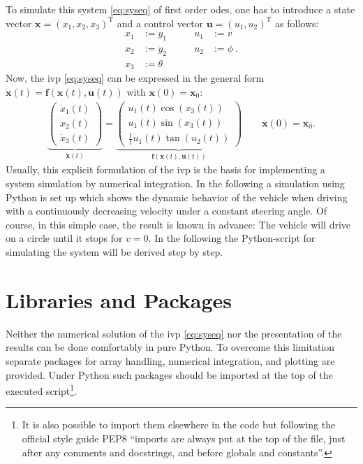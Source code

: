 \documentclass[a4paper,12pt,headinclude=true,headsepline,parskip=half,DIV=12]{scrartcl}
\newcommand{\uu}{\mathbf{u}}
\newcommand{\f}{\mathbf{f}}
\newcommand{\x}{\mathbf{x}}
\newcommand{\xZero}{\mathbf{x}_0}
\begin{document}
To simulate this system \eqref{eq:syseq} of first order \glspl{ode}, one has to introduce a state vector $\x=(x_1,x_2,x_3)^\mathrm{T}$ and a control vector $\uu=(u_1,u_2)^\mathrm{T}$ as follows:
\begin{subequations}
\begin{alignat}{2}
x_1 &:= y_1 &\qquad u_1 &:= v\\
x_2 &:= y_2 &\qquad  u_2 &:= \phi \:. \\
x_3 &:= \theta
\end{alignat}
\end{subequations}
Now, the \gls{ivp} \eqref{eq:syseq} can be expressed in the general form $\dot{\x}(t)=\f(\x(t),\uu(t))$ with $\x(0) = \xZero$:
\label{eq:ss_system}
\begin{align} \label{eq:odesys}
\underbrace{\begin{pmatrix} \dot{x}_1(t) \\ \dot{x}_2(t) \\ \dot{x}_3(t) \end{pmatrix}}_{\dot{\x}(t)} = \underbrace{\begin{pmatrix}  u_1(t) \cos(x_3(t)) \\ u_1(t) \sin(x_3(t)) \\ \frac{1}{l}u_1(t) \tan(u_2(t)) \end{pmatrix}}_{\f(\x(t),\uu(t))} \qquad \x(0) = \xZero.
\end{align}
Usually, this explicit formulation of the \gls{ivp} is the basis for implementing a system simulation by numerical integration. In the following a simulation using Python is set up which shows the dynamic behavior of the vehicle when driving with a continuously decreasing velocity under a constant steering angle. Of course, in this simple case, the result is known in advance: The vehicle will drive on a circle until it stops for $v = 0$. In the following the Python-script for simulating the system will be derived step by step.


\section{Libraries and Packages}
Neither the numerical solution of the \gls{ivp} \eqref{eq:syseq} nor the presentation of the results can be done comfortably in pure Python. To overcome this limitation separate packages for array handling, numerical integration, and plotting are provided. Under Python such packages should be imported at the top of the executed script\footnote{It is also possible to import them elsewhere in the code but following the official style guide PEP8 ``imports are always put at the top of the file, just after any comments and docstrings, and before globals and constants''.}.
\end{document}
